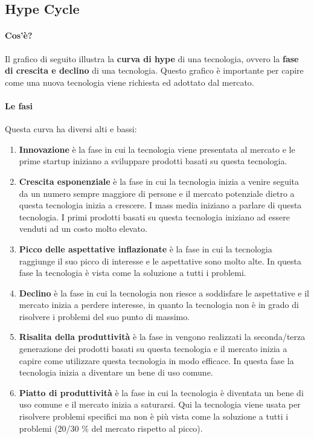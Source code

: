     \subsection{Hype Cycle}
        \paragraph{Cos'è?} Il grafico di seguito illustra la \textbf{curva di hype} di una tecnologia, ovvero la \textbf{fase di crescita e declino} di una tecnologia. Questo grafico è importante per capire come una nuova tecnologia viene richiesta ed adottato dal mercato.
        \paragraph{Le fasi} Questa curva ha diversi alti e bassi:
        \begin{enumerate}
            \item \textbf{Innovazione} è la fase in cui la tecnologia viene presentata al mercato e le prime startup iniziano a sviluppare prodotti basati su questa tecnologia.
            \item \textbf{Crescita esponenziale} è la fase in cui la tecnologia inizia a venire seguita da un numero sempre maggiore di persone e il mercato potenziale dietro a questa tecnologia inizia a crescere. I mass media iniziano a parlare di questa tecnologia. I primi prodotti basati su questa tecnologia iniziano ad essere venduti ad un costo molto elevato.
            \item \textbf{Picco delle aspettative inflazionate} è la fase in cui la tecnologia raggiunge il suo picco di interesse e le aspettative sono molto alte. In questa fase la tecnologia è vista come la soluzione a tutti i problemi.
            \item \textbf{Declino} è la fase in cui la tecnologia non riesce a soddisfare le aspettative e il mercato inizia a perdere interesse, in quanto la tecnologia non è in grado di risolvere i problemi del suo punto di massimo.
            \item \textbf{Risalita della produttività} è la fase in vengono realizzati la seconda/terza generazione dei prodotti basati su questa tecnologia e il mercato inizia a capire come utilizzare questa tecnologia in modo efficace. In questa fase la tecnologia inizia a diventare un bene di uso comune.
            \item \textbf{Piatto di produttività} è la fase in cui la tecnologia è diventata un bene di uso comune e il mercato inizia a saturarsi. Qui la tecnologia viene usata per risolvere problemi specifici ma non è più vista come la soluzione a tutti i problemi (20/30 \% del mercato rispetto al picco).
        \end{enumerate}
